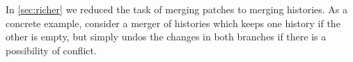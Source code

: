 In \autoref{sec:richer} we reduced the task of merging patches to merging histories.
As a concrete example, consider a merger of histories which keeps one history if the other is empty,
but simply undos the changes in both branches if there is a possibility of conflict.
\begin{code}%
%
\>[2]\AgdaSpace{}%
\AgdaSymbol{:}%
\>[619I]\AgdaSymbol{\{}\AgdaSpace{}%
\AgdaSpace{}%
\AgdaSymbol{:}\AgdaSpace{}%
\AgdaSymbol{\}}\AgdaSpace{}%
\<%
\\
\>[.][@{}l@{}]\<[619I]%
\>[15]\AgdaSymbol{(}\AgdaSpace{}%
\AgdaSymbol{:}\AgdaSpace{}%
\AgdaSpace{}%
\AgdaSpace{}%
\AgdaSymbol{)}\AgdaSpace{}%
\AgdaSymbol{(}\AgdaSpace{}%
\AgdaSymbol{:}\AgdaSpace{}%
\AgdaSpace{}%
\AgdaSpace{}%
\AgdaSymbol{)}\AgdaSpace{}%
\<%
\\
%
\>[15]\AgdaFunction{Σ[}\AgdaSpace{}%
\AgdaSpace{}%
\AgdaSpace{}%
\AgdaSpace{}%
\AgdaFunction{]}\AgdaSpace{}%
\AgdaSymbol{(}\AgdaFunction{Σ[}\AgdaSpace{}%
\AgdaSpace{}%
\AgdaSpace{}%
\AgdaSpace{}%
\AgdaSpace{}%
\AgdaSpace{}%
\AgdaFunction{]}\AgdaSpace{}%
\AgdaSymbol{(}\AgdaSpace{}%
\AgdaSpace{}%
\AgdaSpace{}%
\AgdaSpace{}%
\AgdaSpace{}%
\AgdaSpace{}%
\AgdaSymbol{))}\<%
\\
%
\>[2]\AgdaSpace{}%
\AgdaSymbol{\{\AgdaUnderscore{}\}}\AgdaSpace{}%
\AgdaSymbol{\{}\AgdaSymbol{\}}\AgdaSpace{}%
\AgdaInductiveConstructor{[]}\AgdaSpace{}%
\AgdaSpace{}%
\AgdaSymbol{=}\AgdaSpace{}%
\AgdaSpace{}%
\AgdaOperator{\AgdaInductiveConstructor{,}}\AgdaSpace{}%
\AgdaSpace{}%
\AgdaOperator{\AgdaInductiveConstructor{,}}\AgdaSpace{}%
\AgdaSymbol{(}\AgdaSpace{}%
\AgdaOperator{\AgdaInductiveConstructor{,}}\AgdaSpace{}%
\AgdaSpace{}%
\AgdaSymbol{)}\AgdaSpace{}%
\AgdaOperator{\AgdaInductiveConstructor{,}}\AgdaSpace{}%
\AgdaSymbol{(}\AgdaInductiveConstructor{[]}\AgdaSpace{}%
\AgdaOperator{\AgdaInductiveConstructor{,}}\AgdaSpace{}%
\AgdaSymbol{)}\<%
\\
%
\>[2]\AgdaSpace{}%

\end{code}
